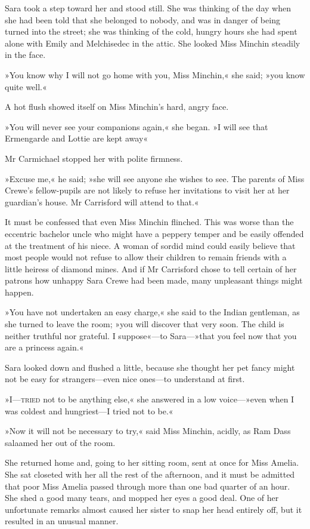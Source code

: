 Sara took a step toward her and stood still. She was thinking of the day when she had been told that she belonged to nobody, and was in danger of being turned into the street; she was thinking of the cold, hungry hours she had spent alone with Emily and Melchisedec in the attic. She looked Miss Minchin steadily in the face.

»You know why I will not go home with you, Miss Minchin,« she said; »you know quite well.«

A hot flush showed itself on Miss Minchin's hard, angry face.

»You will never see your companions again,« she began. »I will see that Ermengarde and Lottie are kept away\longdash«

Mr Carmichael stopped her with polite firmness.

»Excuse me,« he said; »she will see anyone she wishes to see. The parents of Miss Crewe's fellow-pupils are not likely to refuse her invitations to visit her at her guardian's house. Mr Carrisford will attend to that.«

It must be confessed that even Miss Minchin flinched. This was worse than the eccentric bachelor uncle who might have a peppery temper and be easily offended at the treatment of his niece. A woman of sordid mind could easily believe that most people would not refuse to allow their children to remain friends with a little heiress of diamond mines. And if Mr Carrisford chose to tell certain of her patrons how unhappy Sara Crewe had been made, many unpleasant things might happen.

»You have not undertaken an easy charge,« she said to the Indian gentleman, as she turned to leave the room; »you will discover that very soon. The child is neither truthful nor grateful. I suppose«—to Sara—»that you feel now that you are a princess again.«

Sara looked down and flushed a little, because she thought her pet fancy might not be easy for strangers—even nice ones—to understand at first.

»I—\textsc{tried} not to be anything else,« she answered in a low voice—»even when I was coldest and hungriest—I tried not to be.«

»Now it will not be necessary to try,« said Miss Minchin, acidly, as Ram Dass salaamed her out of the room.


She returned home and, going to her sitting room, sent at once for Miss Amelia. She sat closeted with her all the rest of the afternoon, and it must be admitted that poor Miss Amelia passed through more than one bad quarter of an hour. She shed a good many tears, and mopped her eyes a good deal. One of her unfortunate remarks almost caused her sister to snap her head entirely off, but it resulted in an unusual manner.

